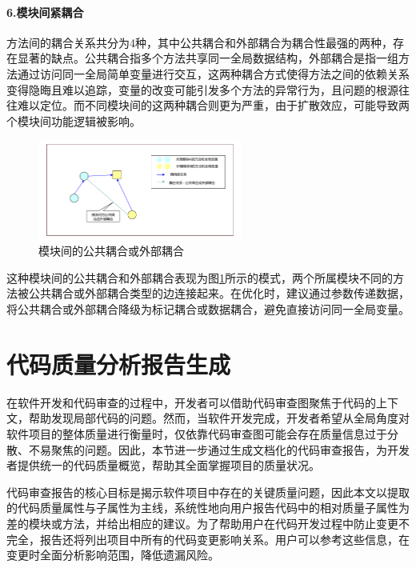 \paragraph{6.模块间紧耦合} 方法间的耦合关系共分为4种，其中公共耦合和外部耦合为耦合性最强的两种，存在显著的缺点。公共耦合指多个方法共享同一全局数据结构，外部耦合是指一组方法通过访问同一全局简单变量进行交互，这两种耦合方式使得方法之间的依赖关系变得隐晦且难以追踪，变量的改变可能引发多个方法的异常行为，且问题的根源往往难以定位。而不同模块间的这两种耦合则更为严重，由于扩散效应，可能导致两个模块间功能逻辑被影响。


\begin{figure}[h]
\centering
\includegraphics[width = 0.6\textwidth]{figures/4_模块间公共耦合.pdf}
\caption{模块间的公共耦合或外部耦合}
\label{1_模块间的公共耦合或外部耦合}
\end{figure}

这种模块间的公共耦合和外部耦合表现为图\ref{1_模块间的公共耦合或外部耦合}所示的模式，两个所属模块不同的方法被公共耦合或外部耦合类型的边连接起来。在优化时，建议通过参数传递数据，将公共耦合或外部耦合降级为标记耦合或数据耦合，避免直接访问同一全局变量。



\section{代码质量分析报告生成}

在软件开发和代码审查的过程中，开发者可以借助代码审查图聚焦于代码的上下文，帮助发现局部代码的问题。然而，当软件开发完成，开发者希望从全局角度对软件项目的整体质量进行衡量时，仅依靠代码审查图可能会存在质量信息过于分散、不易聚焦的问题。因此，本节进一步通过生成文档化的代码审查报告，为开发者提供统一的代码质量概览，帮助其全面掌握项目的质量状况。

代码审查报告的核心目标是揭示软件项目中存在的关键质量问题，因此本文以提取的代码质量属性与子属性为主线，系统性地向用户报告代码中的相对质量子属性为差的模块或方法，并给出相应的建议。为了帮助用户在代码开发过程中防止变更不完全，报告还将列出项目中所有的代码变更影响关系。用户可以参考这些信息，在变更时全面分析影响范围，降低遗漏风险。

